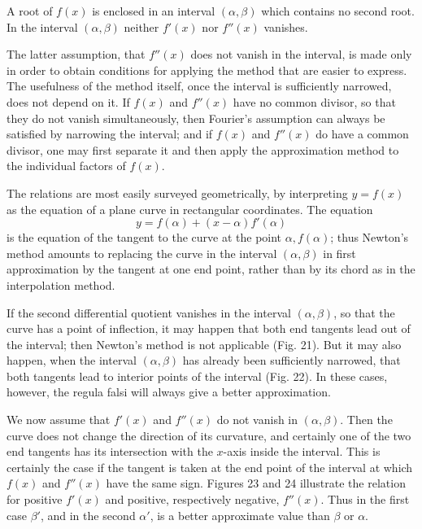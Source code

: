 \documentclass[11pt]{article}
\begin{document}
A root of $f(x)$ is enclosed in an interval $(\alpha,\beta)$ which contains no second root. In the interval $(\alpha,\beta)$ neither $f'(x)$ nor $f''(x)$ vanishes.

The latter assumption, that $f''(x)$ does not vanish in the interval, is made only in order to obtain conditions for applying the method that are easier to express. The usefulness of the method itself, once the interval is sufficiently narrowed, does not depend on it. If $f(x)$ and $f''(x)$ have no common divisor, so that they do not vanish simultaneously, then Fourier's assumption can always be satisfied by narrowing the interval; and if $f(x)$ and $f''(x)$ do have a common divisor, one may first separate it and then apply the approximation method to the individual factors of $f(x)$.

The relations are most easily surveyed geometrically, by interpreting $y=f(x)$ as the equation of a plane curve in rectangular coordinates. The equation
\[
        y=f(\alpha)+(x-\alpha)f'(\alpha)
\tag{3}
\]
is the equation of the tangent to the curve at the point $\alpha,f(\alpha)$; thus Newton's method amounts to replacing the curve in the interval $(\alpha,\beta)$ in first approximation by the tangent at one end point, rather than by its chord as in the interpolation method.

\weberfigtwentyone
\weberfigtwentytwo
\weberfigtwentythree
\weberfigtwentyfour

If the second differential quotient vanishes in the interval $(\alpha,\beta)$, so that the curve has a point of inflection, it may happen that both end tangents lead out of the interval; then Newton's method is not applicable (Fig. 21). But it may also happen, when the interval $(\alpha,\beta)$ has already been sufficiently narrowed, that both tangents lead to interior points of the interval (Fig. 22). In these cases, however, the regula falsi will always give a better approximation.

We now assume that $f'(x)$ and $f''(x)$ do not vanish in $(\alpha,\beta)$. Then the curve does not change the direction of its curvature, and certainly one of the two end tangents has its intersection with the $x$-axis inside the interval. This is certainly the case if the tangent is taken at the end point of the interval at which $f(x)$ and $f''(x)$ have the same sign. Figures 23 and 24 illustrate the relation for positive $f'(x)$ and positive, respectively negative, $f''(x)$. Thus in the first case $\beta'$, and in the second $\alpha'$, is a better approximate value than $\beta$ or $\alpha$.
\end{document}
